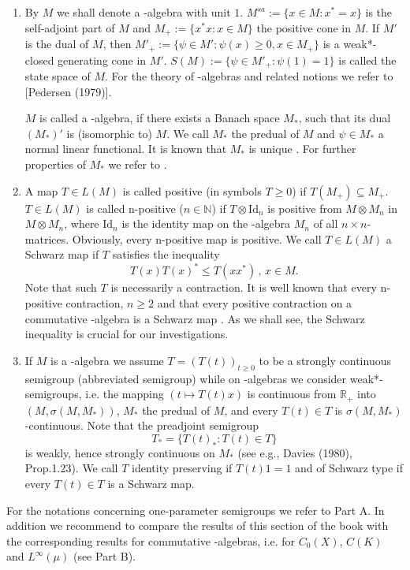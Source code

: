 \begin{enumerate}[1. , wide]

\item
By $ M $ we shall denote a \CA-algebra with unit $ 1 $.
$ M^{sa} := \{x \in M : x^{*} = x\} $ is the self-adjoint part of $ M $ and $ M_{+} := \{ x^{*}x : x \in M\} $ the positive cone in $ M $.
If $ M' $ is the dual of $ M $, then $ M'_{+} := \{\psi \in M' : \psi(x) \geq 0, x \in M_{+}\} $ is a weak*-closed generating cone in $ M' $.
$ S(M) := \{\psi \in M'_{+}: \psi(1) = 1\} $ is called the state space of $ M $.
For the theory of \CA-algebras and related notions we refer to [Pedersen (1979)].

$ M $ is called a \WA-algebra, if there exists a Banach space $ M_{*} $, such that its dual $ (M_{*})' $ is (isomorphic to) $ M $.
We call $ M_{*} $ the predual of $ M $ and $ \psi \in M_{*} $ a normal linear functional.
It is known that $ M_{*} $ is unique \textcite[1.13.3]{sakai:1971}.
For further properties of $ M_{*} $ we refer to \textcite[Chapter III]{takesaki:1979}.

\item
A map $ T \in L(M) $ is called positive (in symbols $ T \geq 0 $) if $ T(M_{+}) \subseteq M_{+} $.
$ T \in L(M) $ is called n-positive ($ n \in \mathbb{N} $) if $ T \otimes \text{Id}_{n} $ is positive from $ M \otimes M_{n} $ in $ M \otimes M_{n} $, where $ \text{Id}_{n} $ is the identity map on the \CA-algebra $ M_{n} $ of all $ n \times n $-matrices.
Obviously, every n-positive map is positive.
We call $ T \in L(M) $ a Schwarz map if $ T $ satisfies the inequality
\[
T(x)T(x)^{*} \leq T(xx^{*}) \, , \, x \in M .
\]
Note that such $ T $ is necessarily a contraction.
It is well known that every n-positive contraction, $ n \geq 2 $ and that every positive contraction on a commutative \CA-algebra is a Schwarz map \textcite[Corollary IV. 3.8.]{takesaki:1979}.
As we shall see, the Schwarz inequality is crucial for our investigations.

\item If $ M $ is a \CA-algebra we assume $ T = (T(t))_{t \geq 0} $ to be a strongly continuous semigroup (abbreviated semigroup) while on \WA-algebras we consider weak*-semigroups, i.e. the mapping $ (t \mapsto T(t)x) $ is continuous from $ \mathbb{R}_{+} $ into $ (M,\sigma(M,M_{*})) $, $ M_{*} $ the predual of $ M $, and every $ T(t) \in T $ is $ \sigma(M,M_{*}) $-continuous.
Note that the preadjoint semigroup
\[
T_{*} = \{ T(t)_{*} : T(t) \in T \}
\]
is weakly, hence strongly continuous on $ M_{*} $ (see e.g., Davies (1980), Prop.1.23).
We call $ T $ identity preserving if $ T(t)1 = 1 $ and of Schwarz type if every $ T(t) \in T $ is a Schwarz map.

\end{enumerate}
For the notations concerning one-parameter semigroups we refer to Part A.
In addition we recommend to compare the results of this section of the book with the corresponding results for commutative \CA-algebras, i.e. for $ C_{0}(X) $, $ C(K) $ and $ L^\infty(\mu) $ (see Part B).

